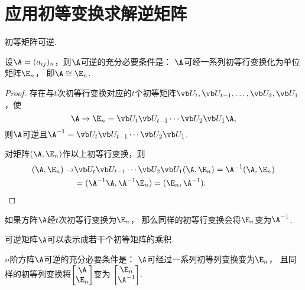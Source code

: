 \section{应用初等变换求解逆矩阵}
\begin{property}\label{theorem:逆矩阵.初等矩阵的性质3}
初等矩阵可逆.
\end{property}

\begin{theorem}\label{theorem:逆矩阵.可逆矩阵与初等矩阵的关系}
设\(\A=(a_{ij})_n\)，则\(\A\)可逆的充分必要条件是：
\(\A\)可经一系列初等行变换化为单位矩阵\(\E_n\)，
即\(\A \cong \E_n\).
\begin{proof}
\def\Ps{\P_t \P_{t-1} \dotsm \P_2 \P_1}
存在与\(t\)次初等行变换对应的\(t\)个初等矩阵\(\P_t,\P_{t-1},\dotsc,\P_2,\P_1\)，使\[
	\A \to \E_n = \Ps \A,
\]
则\(\A\)可逆且\(\A^{-1} = \Ps\).

对矩阵\((\A,\E_n)\)作以上初等行变换，则\begin{align*}
	(\A,\E_n) \to &\Ps(\A,\E_n) = \A^{-1}(\A,\E_n) \\
	&= (\A^{-1}\A,\A^{-1}\E_n) = (\E_n,\A^{-1}).
	\qedhere
\end{align*}
\end{proof}
\end{theorem}

\begin{corollary}\label{theorem:逆矩阵.计算逆矩阵的方法}
如果方阵\(\A\)经\(t\)次初等行变换为\(\E_n\)，
那么同样的初等行变换会将\(\E_n\)变为\(\A^{-1}\).
\end{corollary}

\begin{corollary}
可逆矩阵\(\A\)可以表示成若干个初等矩阵的乘积.
\end{corollary}

\begin{corollary}
\(n\)阶方阵\(\A\)可逆的充分必要条件是：
\(\A\)可经过一系列初等列变换变为\(\E_n\)，
且同样的初等列变换将\(\begin{bmatrix}\A\\\E_n\end{bmatrix}\)变为
\(\begin{bmatrix}\E_n\\\A^{-1}\end{bmatrix}\).
\end{corollary}

